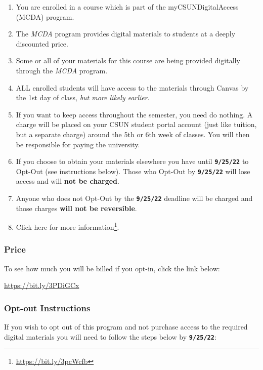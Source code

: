 \documentclass[
  letterpaper,
  DIV=11,
  numbers=noendperiod,
  oneside]{scrartcl}
\providecommand{\tightlist}{%
  \setlength{\itemsep}{0pt}\setlength{\parskip}{0pt}}\usepackage{longtable,booktabs,array}
\DeclareRobustCommand{\href}[2]{#2\footnote{\url{#1}}}
\begin{document}
\begin{enumerate}
\def\labelenumi{\arabic{enumi}.}
\tightlist
\item
  You are enrolled in a course which is part of the myCSUNDigitalAccess
  (MCDA) program.
\item
  The \emph{MCDA} program provides digital materials to students at a
  deeply discounted price.
\item
  Some or all of your materials for this course are being provided
  digitally through the \emph{MCDA} program.
\item
  ALL enrolled students will have access to the materials through Canvas
  by the 1st day of class, \emph{but more likely earlier}.
\item
  If you want to keep access throughout the semester, you need do
  nothing. A charge will be placed on your CSUN student portal account
  (just like tuition, but a separate charge) around the 5th or 6th week
  of classes. You will then be responsible for paying the university.
\item
  If you choose to obtain your materials elsewhere you have until
  \textbf{\texttt{9/25/22}} to Opt-Out (see instructions below). Those
  who Opt-Out by \textbf{\texttt{9/25/22}} will lose access and will
  \textbf{not be charged}.
\item
  Anyone who does not Opt-Out by the \textbf{\texttt{9/25/22}} deadline
  will be charged and those charges \textbf{will not be reversible}.
\item
  \href{https://bit.ly/3pcWcfb}{Click here for more information}.
\end{enumerate}

\hypertarget{price}{%
\subsubsection{Price}\label{price}}

To see how much you will be billed if you opt-in, click the link below:

\url{https://bit.ly/3PDiGCx}

\hypertarget{opt-out-instructions}{%
\subsubsection{Opt-out Instructions}\label{opt-out-instructions}}

If you wish to opt out of this program and not purchase access to the
required digital materials you will need to follow the steps below by
\textbf{\texttt{9/25/22}}:
\end{document}

